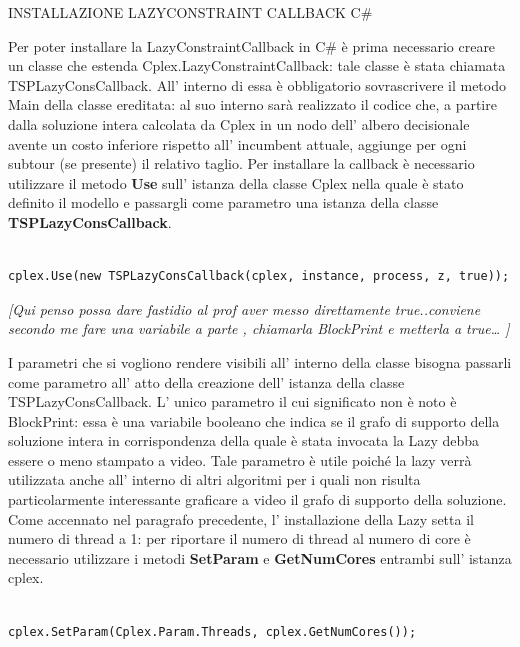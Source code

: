 \documentclass[11pt]{article}
\begin{document}
\vspace{2\baselineskip}
INSTALLAZIONE LAZYCONSTRAINT CALLBACK C\#
\vspace{2\baselineskip}


Per poter installare la LazyConstraintCallback in C\# è prima necessario creare un classe che estenda Cplex.LazyConstraintCallback: tale classe è stata chiamata TSPLazyConsCallback. All' interno di essa è obbligatorio sovrascrivere il metodo Main della classe ereditata: al suo interno sarà realizzato il codice che, a partire dalla soluzione intera calcolata da Cplex in un nodo dell' albero decisionale avente un costo inferiore rispetto all' incumbent attuale, aggiunge per ogni subtour (se presente) il relativo taglio.
Per installare la callback è necessario utilizzare il metodo \textbf{Use} sull' istanza della classe Cplex nella quale è stato definito il modello e passargli come parametro una istanza della classe \textbf{TSPLazyConsCallback}. 
\begin{lstlisting}

cplex.Use(new TSPLazyConsCallback(cplex, instance, process, z, true));

\end{lstlisting}


\textit{[Qui penso possa dare fastidio al prof aver messo direttamente true..conviene secondo me fare una variabile a parte , chiamarla BlockPrint e metterla a true… ]}

I parametri che si vogliono rendere visibili all' interno della classe bisogna passarli come parametro all' atto della creazione dell' istanza della classe TSPLazyConsCallback. L' unico parametro il cui significato non è noto è BlockPrint: essa è una variabile booleano che indica se il grafo di supporto della soluzione intera in corrispondenza della quale è stata invocata la Lazy debba essere o meno stampato a video. Tale parametro è utile poiché la lazy verrà utilizzata anche all' interno di altri  algoritmi per i quali non risulta particolarmente interessante graficare a video il grafo di supporto della soluzione. 
Come accennato nel paragrafo precedente, l' installazione della Lazy setta il numero di thread a 1: per riportare il numero di thread al numero di core è necessario utilizzare i metodi \textbf{SetParam} e \textbf{GetNumCores} entrambi sull' istanza cplex.


\begin{lstlisting}

cplex.SetParam(Cplex.Param.Threads, cplex.GetNumCores());

\end{lstlisting}
\end{document}
